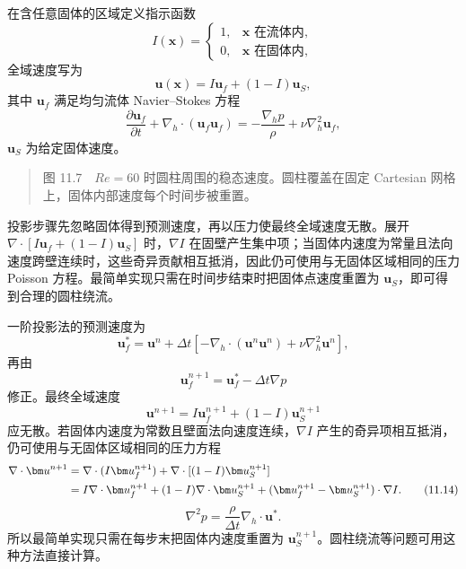 \documentclass[11pt,a4paper,openany,fontset=none]{ctexbook}
\begin{document}
在含任意固体的区域定义指示函数
\begin{equation}
 I(\bm x)=\begin{cases}1,&\bm x\text{ 在流体内},\\0,&\bm x\text{ 在固体内},\end{cases} \tag{11.8}
\end{equation}
全域速度写为
\begin{equation}
 \bm u(\bm x)=I\bm u_f+(1-I)\bm u_S, \tag{11.9}
\end{equation}
其中 $\bm u_f$ 满足均匀流体 Navier--Stokes 方程
\begin{equation}
 \frac{\partial\bm u_f}{\partial t}+\nabla_h\cdot(\bm u_f\bm u_f)
 =-\frac{\nabla_hp}{\rho}+\nu\nabla_h^2\bm u_f, \tag{11.10}
\end{equation}
$\bm u_S$ 为给定固体速度。

\begin{quote}\small 图 11.7　$Re=60$ 时圆柱周围的稳态速度。圆柱覆盖在固定 Cartesian 网格上，固体内部速度每个时间步被重置。\end{quote}
投影步骤先忽略固体得到预测速度，再以压力使最终全域速度无散。展开 $\nabla\cdot[I\bm u_f+(1-I)\bm u_S]$ 时，$\nabla I$ 在固壁产生集中项；当固体内速度为常量且法向速度跨壁连续时，这些奇异贡献相互抵消，因此仍可使用与无固体区域相同的压力 Poisson 方程。最简单实现只需在时间步结束时把固体点速度重置为 $\bm u_S$，即可得到合理的圆柱绕流。

一阶投影法的预测速度为
\begin{equation}
 \bm u_f^*=\bm u^n+\Delta t[-\nabla_h\cdot(\bm u^n\bm u^n)+\nu\nabla_h^2\bm u^n], \tag{11.11}
\end{equation}
再由
\begin{equation}
 \bm u_f^{n+1}=\bm u_f^*-\Delta t\nabla p \tag{11.12}
\end{equation}
修正。最终全域速度
\begin{equation}
 \bm u^{n+1}=I\bm u_f^{n+1}+(1-I)\bm u_S^{n+1} \tag{11.13}
\end{equation}
应无散。若固体内速度为常数且壁面法向速度连续，$\nabla I$ 产生的奇异项相互抵消，仍可使用与无固体区域相同的压力方程
\begin{align}
 \nabla\cdot\bm u^{n+1}
 &=\nabla\cdot(I\bm u_f^{n+1})+
   \nabla\cdot[(1-I)\bm u_S^{n+1}] \notag\\
 &=I\nabla\cdot\bm u_f^{n+1}+(1-I)\nabla\cdot\bm u_S^{n+1}
  +(\bm u_f^{n+1}-\bm u_S^{n+1})\cdot\nabla I. \tag{11.14}
\end{align}
\begin{equation}
 \nabla^2p=\frac{\rho}{\Delta t}\nabla_h\cdot\bm u^*. \tag{11.15}
\end{equation}
所以最简单实现只需在每步末把固体内速度重置为 $\bm u_S^{n+1}$。圆柱绕流等问题可用这种方法直接计算。
\end{document}
